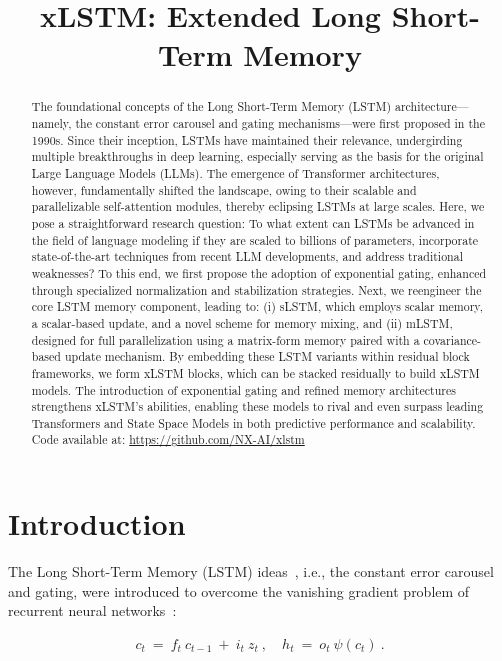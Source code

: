 \title{xLSTM: Extended Long Short-Term Memory}

\begin{abstract}
The foundational concepts of the Long Short-Term Memory (LSTM) architecture—namely, the constant error carousel and gating mechanisms—were first proposed in the 1990s. Since their inception, LSTMs have maintained their relevance, undergirding multiple breakthroughs in deep learning, especially serving as the basis for the original Large Language Models (LLMs). The emergence of Transformer architectures, however, fundamentally shifted the landscape, owing to their scalable and parallelizable self-attention modules, thereby eclipsing LSTMs at large scales. Here, we pose a straightforward research question: To what extent can LSTMs be advanced in the field of language modeling if they are scaled to billions of parameters, incorporate state-of-the-art techniques from recent LLM developments, and address traditional weaknesses? To this end, we first propose the adoption of exponential gating, enhanced through specialized normalization and stabilization strategies. Next, we reengineer the core LSTM memory component, leading to: (i) sLSTM, which employs scalar memory, a scalar-based update, and a novel scheme for memory mixing, and (ii) mLSTM, designed for full parallelization using a matrix-form memory paired with a covariance-based update mechanism. By embedding these LSTM variants within residual block frameworks, we form xLSTM blocks, which can be stacked residually to build xLSTM models. The introduction of exponential gating and refined memory architectures strengthens xLSTM’s abilities, enabling these models to rival and even surpass leading Transformers and State Space Models in both predictive performance and scalability.\\
Code available at: \url{https://github.com/NX-AI/xlstm}
\end{abstract}

\section{Introduction}
\label{sec:intro}

The Long Short-Term Memory (LSTM) ideas~\citep{Hochreiter:91,Hochreiter:97nips,Hochreiter:97}, i.e., the constant error carousel and gating, were introduced to overcome the vanishing gradient problem of recurrent neural networks~\citep{Hochreiter:91,Hochreiter:00book}:

\begin{align}
\label{eq:lstm_idea}
  c_t \ = \ f_t \ c_{t-1} \ + \ 
          i_t \  z_t \ , \quad  
          h_t \ = \ o_t \ \psi({c_t}) \ . 
\end{align}

